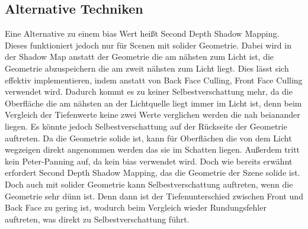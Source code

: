 \subsection{Alternative Techniken}
\label{section:sdsm}
Eine Alternative zu einem bias Wert heißt Second Depth Shadow Mapping.
Dieses funktioniert jedoch nur für Scenen mit solider Geometrie.
Dabei wird in der Shadow Map anstatt der Geometrie die am nähsten zum 
Licht ist, die Geometrie abzuspeichern die am zweit nähsten zum Licht liegt.
Dies lässt sich effektiv implementieren, indem anstatt von Back Face Culling, Front Face Culling verwendet wird.
Dadurch kommt es zu keiner Selbestverschattung mehr, da die Oberfläche die am nähsten an der 
Lichtquelle liegt immer im Licht ist, denn beim Vergleich der Tiefenwerte 
keine zwei Werte verglichen werden die nah beianander liegen.
Es könnte jedoch Selbestverschattung auf der Rückseite der Geometrie auftreten.
Da die Geometrie solide ist, kann für Oberflächen die von dem Licht wegzeigen direkt 
angenommen werden das sie im Schatten liegen.
Außerdem tritt kein Peter-Panning auf, da kein bias verwendet wird.
Doch wie bereits erwähnt erfordert Second Depth Shadow Mapping, das die
Geometrie der Szene solide ist.
Doch auch mit solider Geometrie kann Selbestverschattung auftreten,
wenn die Geometrie sehr dünn ist.
Denn dann ist der Tiefenunterschied zwischen Front und Back Face zu gering ist, wodurch
beim Vergleich wieder Rundungsfehler auftreten, was direkt zu Selbestverschattung führt.
